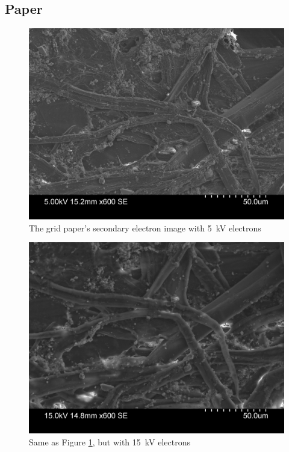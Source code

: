 \documentclass[a4paper]{scrartcl}
\begin{document}
\subsection{Paper}
\begin{figure}
    \centering
    \includegraphics[width = 15cm]{measurements/SE-paper-5kV.png}
    \caption{The grid paper's secondary electron image with \SI{5}{\kilo\volt} electrons}
    \label{fig:se-paper-5kV}
\end{figure}
\begin{figure}
    \centering
    \includegraphics[width = 15cm]{measurements/SE-paper-15kV.png}
    \caption{Same as Figure \ref{fig:se-paper-5kV}, but with \SI{15}{\kilo\volt} electrons}
    \label{fig:se-paper-15kV}
\end{figure}
\end{document}
